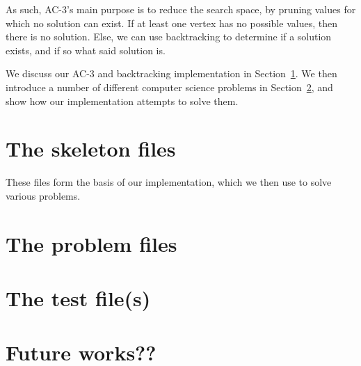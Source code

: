 \documentclass[12pt,a4paper]{article}
\begin{document}
As such, AC-3's main purpose is to reduce the search space, by pruning values for which no
 solution can exist. If at least one vertex has no possible values, then there is no solution.
Else, we can use backtracking to determine if a solution exists, and if so what said solution is.

We discuss our AC-3 and backtracking implementation in Section~\ref{sec:skeleton}. 
We then introduce a number of different computer science problems in Section~\ref{sec:problems}, and show how our implementation
attempts to solve them. 

\section{The skeleton files}\label{sec:skeleton}
These files form the basis of our implementation, which we then use to solve various problems.





\section{The problem files}\label{sec:problems} %












\section{The test file(s)}





\section{Future works??}



\end{document}
